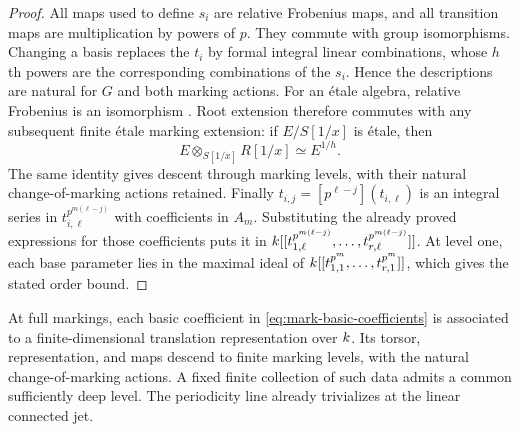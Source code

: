 \begin{proof}
All maps used to define $s_i$ are relative Frobenius maps, and all
transition maps are multiplication by powers of $p$.  They commute
with group isomorphisms.  Changing a basis replaces the $t_i$ by
formal integral linear combinations, whose $h$th powers are the
corresponding combinations of the $s_i$.  Hence the descriptions
are natural for $G$ and both marking actions.  For an \'{e}tale
algebra, relative Frobenius is an isomorphism
\cite[Lemma~41.14.3, Tag~0EBS]{stacks}.  Root extension therefore
commutes with any subsequent finite \'{e}tale marking extension:
if $E/S[1/x]$ is \'{e}tale, then
\[
 E\otimes_{S[1/x]}R[1/x]\simeq E^{1/h}.
\]
The same identity gives descent through marking levels, with their
natural change-of-marking actions retained.  Finally
$t_{i,j}=[p^{\ell-j}](t_{i,\ell})$ is an integral series in
$t_{i,\ell}^{p^{m(\ell-j)}}$ with coefficients in $A_m$.
Substituting the already proved expressions for those coefficients
puts it in
$k[[t_{1,\ell}^{p^{m(\ell-j)}},\ldots,
 t_{r,\ell}^{p^{m(\ell-j)}}]]$.
At level one, each base parameter lies in the maximal ideal of
$k[[t_{1,1}^{p^m},\ldots,t_{r,1}^{p^m}]]$, which gives the stated
order bound.
\end{proof}

\begin{lemma}
\label{lem:mark-associated-coefficients}
At full markings, each basic coefficient in
\cref{eq:mark-basic-coefficients} is associated to a finite-dimensional
translation representation over $k$.  Its torsor, representation,
and maps descend to finite marking levels, with the natural
change-of-marking actions.  A fixed finite collection of such data
admits a common sufficiently deep level.  The periodicity line
already trivializes at the linear connected jet.
\end{lemma}

